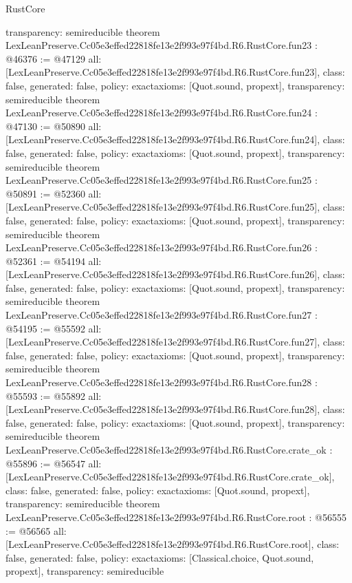 \begin{lexlean}{RustCore}
\begin{coremodule}
{  transparency: semireducible
}
theorem LexLeanPreserve.Cc05e3effed22818fe13e2f993e97f4bd.R6.RustCore.fun23 : @46376 := @47129 {
  all: [LexLeanPreserve.Cc05e3effed22818fe13e2f993e97f4bd.R6.RustCore.fun23],
  class: false,
  generated: false,
  policy: exact{axioms: [Quot.sound, propext]},
  transparency: semireducible
}
theorem LexLeanPreserve.Cc05e3effed22818fe13e2f993e97f4bd.R6.RustCore.fun24 : @47130 := @50890 {
  all: [LexLeanPreserve.Cc05e3effed22818fe13e2f993e97f4bd.R6.RustCore.fun24],
  class: false,
  generated: false,
  policy: exact{axioms: [Quot.sound, propext]},
  transparency: semireducible
}
theorem LexLeanPreserve.Cc05e3effed22818fe13e2f993e97f4bd.R6.RustCore.fun25 : @50891 := @52360 {
  all: [LexLeanPreserve.Cc05e3effed22818fe13e2f993e97f4bd.R6.RustCore.fun25],
  class: false,
  generated: false,
  policy: exact{axioms: [Quot.sound, propext]},
  transparency: semireducible
}
theorem LexLeanPreserve.Cc05e3effed22818fe13e2f993e97f4bd.R6.RustCore.fun26 : @52361 := @54194 {
  all: [LexLeanPreserve.Cc05e3effed22818fe13e2f993e97f4bd.R6.RustCore.fun26],
  class: false,
  generated: false,
  policy: exact{axioms: [Quot.sound, propext]},
  transparency: semireducible
}
theorem LexLeanPreserve.Cc05e3effed22818fe13e2f993e97f4bd.R6.RustCore.fun27 : @54195 := @55592 {
  all: [LexLeanPreserve.Cc05e3effed22818fe13e2f993e97f4bd.R6.RustCore.fun27],
  class: false,
  generated: false,
  policy: exact{axioms: [Quot.sound, propext]},
  transparency: semireducible
}
theorem LexLeanPreserve.Cc05e3effed22818fe13e2f993e97f4bd.R6.RustCore.fun28 : @55593 := @55892 {
  all: [LexLeanPreserve.Cc05e3effed22818fe13e2f993e97f4bd.R6.RustCore.fun28],
  class: false,
  generated: false,
  policy: exact{axioms: [Quot.sound, propext]},
  transparency: semireducible
}
theorem LexLeanPreserve.Cc05e3effed22818fe13e2f993e97f4bd.R6.RustCore.crate_ok : @55896 := @56547 {
  all: [LexLeanPreserve.Cc05e3effed22818fe13e2f993e97f4bd.R6.RustCore.crate_ok],
  class: false,
  generated: false,
  policy: exact{axioms: [Quot.sound, propext]},
  transparency: semireducible
}
theorem LexLeanPreserve.Cc05e3effed22818fe13e2f993e97f4bd.R6.RustCore.root : @56555 := @56565 {
  all: [LexLeanPreserve.Cc05e3effed22818fe13e2f993e97f4bd.R6.RustCore.root],
  class: false,
  generated: false,
  policy: exact{axioms: [Classical.choice, Quot.sound, propext]},
  transparency: semireducible
}


\end{coremodule}
\end{lexlean}
